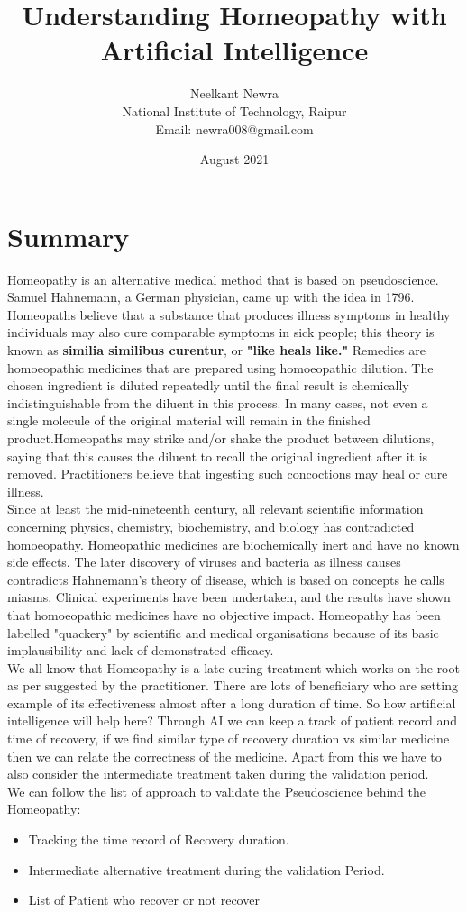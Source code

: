 \documentclass{article}
\title{\textbf{Understanding Homeopathy with Artificial Intelligence}}
\author{Neelkant Newra \\ National Institute of Technology, Raipur \\ Email: newra008@gmail.com}
\date{August 2021}
\begin{document}
\maketitle
\section*{Summary}

Homeopathy is an alternative medical method that is based on pseudoscience. Samuel Hahnemann, a German physician, came up with the idea in 1796. Homeopaths believe that a substance that produces illness symptoms in healthy individuals may also cure comparable symptoms in sick people; this theory is known as \textbf{similia similibus curentur}, or \textbf{"like heals like."} Remedies are homoeopathic medicines that are prepared using homoeopathic dilution. The chosen ingredient is diluted repeatedly until the final result is chemically indistinguishable from the diluent in this process. In many cases, not even a single molecule of the original material will remain in the finished product.Homeopaths may strike and/or shake the product between dilutions, saying that this causes the diluent to recall the original ingredient after it is removed. Practitioners believe that ingesting such concoctions may heal or cure illness.\\


Since at least the mid-nineteenth century, all relevant scientific information concerning physics, chemistry, biochemistry, and biology has contradicted homoeopathy. Homeopathic medicines are biochemically inert and have no known side effects. The later discovery of viruses and bacteria as illness causes contradicts Hahnemann's theory of disease, which is based on concepts he calls miasms. Clinical experiments have been undertaken, and the results have shown that homoeopathic medicines have no objective impact. Homeopathy has been labelled "quackery" by scientific and medical organisations because of its basic implausibility and lack of demonstrated efficacy. \\


We all know that Homeopathy is a late curing treatment which works on the root as per suggested by the practitioner. There are lots of beneficiary who are setting example of its effectiveness almost after a long duration of time. So how artificial intelligence will help here?  Through AI we can keep a track of patient record and time of recovery, if we find similar type of recovery duration vs similar medicine then we can relate the correctness of the medicine. Apart from this we have to also consider the intermediate treatment taken during the validation period. \\

We can follow the list of approach to validate the Pseudoscience behind the Homeopathy:

\begin{itemize}
	\item Tracking the time record of Recovery duration.
	\item Intermediate alternative treatment during the validation Period.
	\item List of Patient who recover or not recover
\end{itemize}
\end{document}
